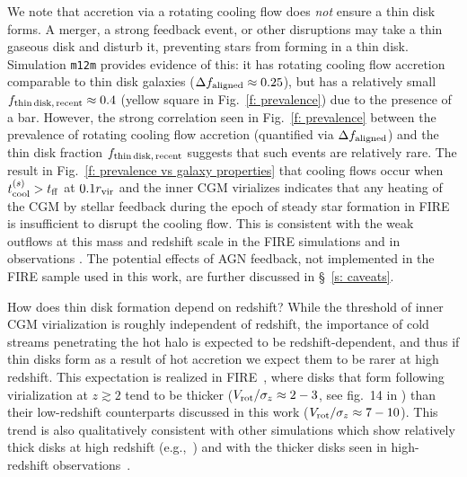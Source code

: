 \documentclass[fleqn,usenatbib]{mnras}
\newcommand{\fthin}{f_{\rm thin\,disk,\,recent}}
\newcommand{\Rvir}{r_{\rm vir}}
\begin{document}
We note that accretion via a rotating cooling flow does \textit{not} ensure a thin disk forms. 
A merger, a strong feedback event, or other disruptions may take a thin gaseous disk and disturb it, preventing stars from forming in a thin disk.
Simulation \texttt{m12m} provides evidence of this:
it has rotating cooling flow accretion comparable to thin disk galaxies ($\Delta f_{\rm aligned} \approx 0.25$), but has a relatively small $\fthin \approx 0.4$ (yellow square in Fig.~\ref{f: prevalence}) due to the presence of a bar.
However, the strong correlation seen in Fig.~\ref{f: prevalence} between the prevalence of rotating cooling flow accretion (quantified via $\Delta f_{\rm aligned}$) and the thin disk fraction $\fthin$ suggests that such events are relatively rare. 
The result in Fig.~\ref{f: prevalence vs galaxy properties} that cooling flows occur when $t_{\rm cool}^{(s)}>t_{\rm ff}$ at $0.1\Rvir$ and the inner CGM virializes indicates that any heating of the CGM by stellar feedback during the epoch of steady star formation in FIRE is insufficient to disrupt the cooling flow.
This is consistent with the weak outflows at this mass and redshift scale in the FIRE simulations \citep{Muratov2015, Muratov2017, Angles-Alcazar2017, Stern2021, Pandya2021} and in observations \citep[e.g.,][]{Heckman2019}.
The potential effects of AGN feedback, not implemented in the FIRE sample used in this work, are further discussed in \S~\ref{s: caveats}. 

How does thin disk formation depend on redshift?
While the threshold of inner CGM virialization is roughly independent of redshift, the importance of cold streams penetrating the hot halo is expected to be redshift-dependent, and thus if thin disks form as a result of hot accretion we expect them to be rarer at high redshift.
This expectation is realized in FIRE~\citep{Angles-Alcazar2017a, Ma2018, Wellons2020}, where disks that form following virialization at $z\gtrsim2$ tend to be thicker ($V_{\rm rot}/\sigma_z\approx2-3$, see fig.~14 in \citealt{Stern2021}) than their low-redshift counterparts discussed in this work ($V_{\rm rot}/\sigma_z\approx7-10$).
This trend is also qualitatively consistent with other simulations which show relatively thick disks at high redshift (e.g.,~\citealt{Pillepich2019, Dekel2019}) and with the thicker disks seen in high-redshift observations~\citep[e.g.][]{Tadaki2017}.
\end{document}
